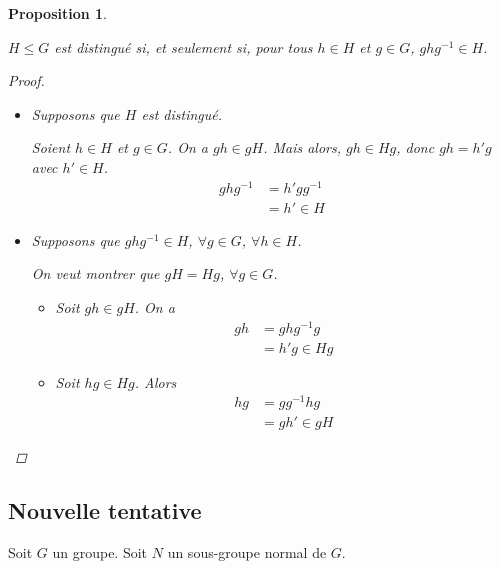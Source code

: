 \documentclass{report}
\newcommand*{\lte}{\leqslant}
\newtheorem*{prop}{Proposition}
\theoremstyle{definition}
\theoremstyle{remark}
\begin{document}
	
	\begin{prop}~

		$H \lte G$ est distingu\'e si, et seulement si, pour tous $h \in H$ et $g \in G$, $ghg^{-1} \in H$.
		\begin{proof}~

			\begin{itemize}
				\item[$(\Rightarrow)$] Supposons que $H$ est distingu\'e.

				Soient $h \in H$ et $g \in G$. On a $gh \in gH$. Mais alors, $gh \in Hg$, donc $gh = h'g$ avec $h' \in H$.
				\begin{align*}
					ghg^{-1}&= h'gg^{-1}\\
					&= h' \in H
				\end{align*}
				\item[$(\Leftarrow)$] Supposons que $ghg^{-1} \in H$, $\forall g \in G$, $\forall h \in H$.

				On veut montrer que $gH=Hg$, $\forall g \in G$.
				\begin{itemize}
					\item[$(\subseteq)$] Soit $gh \in gH$. On a
					\begin{align*}
						gh&= ghg^{-1}g\\
						&= h'g \in Hg
					\end{align*}
					\item[$(\supseteq)$] Soit $hg \in Hg$. Alors
					\begin{align*}
						hg&= gg^{-1}hg\\
						&= gh' \in gH
					\end{align*}
				\end{itemize}
			\end{itemize}
		\end{proof}
	\end{prop}
	\subsection*{Nouvelle tentative}
	Soit $G$ un groupe. Soit $N$ un sous-groupe normal de $G$.
\end{document}
